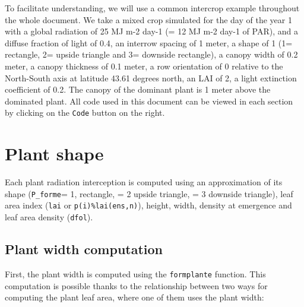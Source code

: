 \documentclass[]{book}
\begin{document}
To facilitate understanding, we will use a common intercrop example throughout the whole document. We take a mixed crop simulated for the day of the year 1 with a global radiation of 25 MJ m-2 day-1 (= 12 MJ m-2 day-1 of PAR), and a diffuse fraction of light of 0.4, an interrow spacing of 1 meter, a shape of 1 (1= rectangle, 2= upside triangle and 3= downside rectangle), a canopy width of 0.2 meter, a canopy thickness of 0.1 meter, a row orientation of 0 relative to the North-South axis at latitude 43.61 degrees north, an LAI of 2, a light extinction coefficient of 0.2. The canopy of the dominant plant is 1 meter above the dominated plant.
All code used in this document can be viewed in each section by clicking on the \texttt{Code} button on the right.

\hypertarget{plant-shape}{%
\section{Plant shape}\label{plant-shape}}

Each plant radiation interception is computed using an approximation of its shape (\texttt{P\_forme}= 1, rectangle, = 2 upside triangle, = 3 downside triangle), leaf area index (\texttt{lai} or \texttt{p(i)\%lai(ens,n)}), height, width, density at emergence and leaf area density (\texttt{dfol}).

\hypertarget{plant-width-computation}{%
\subsection{Plant width computation}\label{plant-width-computation}}

First, the plant width is computed using the \texttt{formplante} function. This computation is possible thanks to the relationship between two ways for computing the plant leaf area, where one of them uses the plant width:
\end{document}
